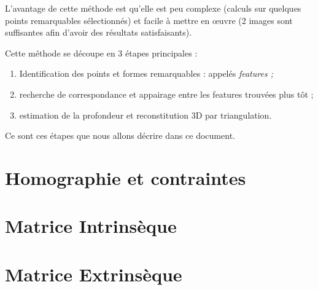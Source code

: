 \documentclass[a4paper]{article}
\begin{document}
L'avantage de cette méthode est qu'elle est peu complexe (calculs sur quelques points remarquables sélectionnés) et facile à mettre en œuvre (2 images sont suffisantes afin d'avoir des résultats satisfaisants).

Cette méthode se découpe en 3 étapes principales :
\begin{enumerate}
  \item Identification des points et formes remarquables : appelés \em{features} ;
  \item recherche de correspondance et appairage entre les features trouvées plus tôt ;
  \item estimation de la profondeur et reconstitution 3D par triangulation.
\end{enumerate}

Ce sont ces étapes que nous allons décrire dans ce document.

\clearpage

\section{Homographie et contraintes}

\clearpage

\section{Matrice Intrinsèque}


\clearpage

\section{Matrice Extrinsèque}


\clearpage
\end{document}
